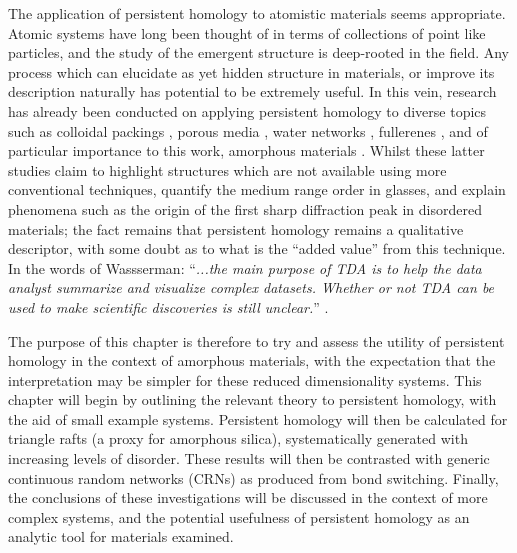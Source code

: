 The application of persistent homology to atomistic materials seems appropriate.
Atomic systems have long been thought of in terms of collections of point like particles, and the study of the emergent structure is deep\--rooted in the field.
Any process which can elucidate as yet hidden structure in materials, or improve its description naturally has potential to be extremely useful.
In this vein, research has already been conducted on applying persistent homology to diverse topics such as colloidal packings \cite{Carter2018}, porous media \cite{Robins2017,Jiang2018}, water networks \cite{Steinberg2019}, fullerenes \cite{Xia2015}, and of particular importance to this work, amorphous materials \cite{Hiraoka2016,Onodera2019,Nakamura2015,Gutierrez2019}.
Whilst these latter studies claim to highlight structures which are not available using more conventional techniques, quantify the medium range order in glasses, and explain phenomena such as the origin of the first sharp diffraction peak in disordered materials; the fact remains that persistent homology remains a qualitative descriptor, with some doubt as to what is the ``added value'' from this technique. 
In the words of Wassserman: ``\textit{...the main purpose of TDA is to help the data analyst summarize and visualize
complex datasets. Whether or not TDA can be used to make scientific discoveries is still unclear.}'' \cite{Wasserman2018}.

The purpose of this chapter is therefore to try and assess the utility of persistent homology in the context of \td{} amorphous materials, with the expectation that the interpretation may be simpler for these reduced dimensionality systems.
This chapter will begin by outlining the relevant theory to persistent homology, with the aid of small example systems.
Persistent homology will then be calculated for triangle rafts (a proxy for amorphous silica), systematically generated with increasing levels of disorder.
These results will then be contrasted with generic continuous random networks (CRNs) as produced from bond switching.
Finally, the conclusions of these investigations will be discussed in the context of more complex systems, and the potential usefulness of persistent homology as an analytic tool for materials examined.

